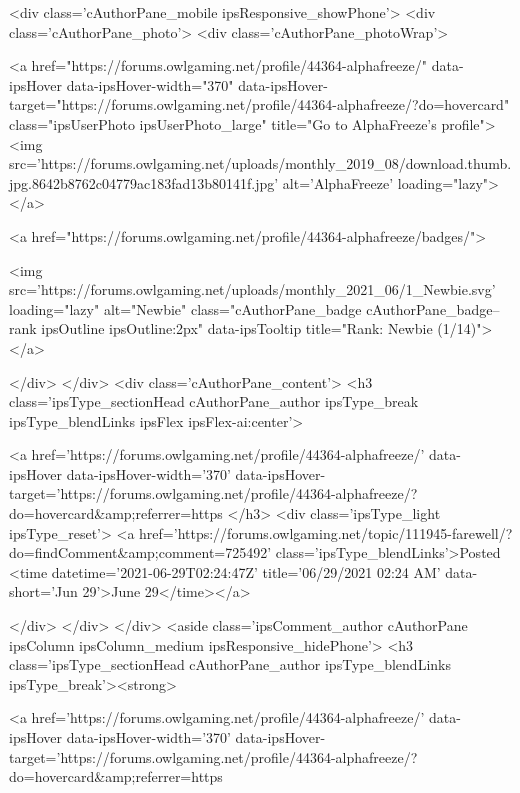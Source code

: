 	

	<div class='cAuthorPane_mobile ipsResponsive_showPhone'>
		<div class='cAuthorPane_photo'>
			<div class='cAuthorPane_photoWrap'>
				


	<a href="https://forums.owlgaming.net/profile/44364-alphafreeze/" data-ipsHover data-ipsHover-width="370" data-ipsHover-target="https://forums.owlgaming.net/profile/44364-alphafreeze/?do=hovercard" class="ipsUserPhoto ipsUserPhoto_large" title="Go to AlphaFreeze's profile">
		<img src='https://forums.owlgaming.net/uploads/monthly_2019_08/download.thumb.jpg.8642b8762c04779ac183fad13b80141f.jpg' alt='AlphaFreeze' loading="lazy">
	</a>

				
				
					<a href="https://forums.owlgaming.net/profile/44364-alphafreeze/badges/">
						
<img src='https://forums.owlgaming.net/uploads/monthly_2021_06/1_Newbie.svg' loading="lazy" alt="Newbie" class="cAuthorPane_badge cAuthorPane_badge--rank ipsOutline ipsOutline:2px" data-ipsTooltip title="Rank: Newbie (1/14)">
					</a>
				
			</div>
		</div>
		<div class='cAuthorPane_content'>
			<h3 class='ipsType_sectionHead cAuthorPane_author ipsType_break ipsType_blendLinks ipsFlex ipsFlex-ai:center'>
				


<a href='https://forums.owlgaming.net/profile/44364-alphafreeze/' data-ipsHover data-ipsHover-width='370' data-ipsHover-target='https://forums.owlgaming.net/profile/44364-alphafreeze/?do=hovercard&amp;referrer=https%
			</h3>
			<div class='ipsType_light ipsType_reset'>
				<a href='https://forums.owlgaming.net/topic/111945-farewell/?do=findComment&amp;comment=725492' class='ipsType_blendLinks'>Posted <time datetime='2021-06-29T02:24:47Z' title='06/29/2021 02:24  AM' data-short='Jun 29'>June 29</time></a>
				
			</div>
		</div>
	</div>
	<aside class='ipsComment_author cAuthorPane ipsColumn ipsColumn_medium ipsResponsive_hidePhone'>
		<h3 class='ipsType_sectionHead cAuthorPane_author ipsType_blendLinks ipsType_break'><strong>


<a href='https://forums.owlgaming.net/profile/44364-alphafreeze/' data-ipsHover data-ipsHover-width='370' data-ipsHover-target='https://forums.owlgaming.net/profile/44364-alphafreeze/?do=hovercard&amp;referrer=https%
			
